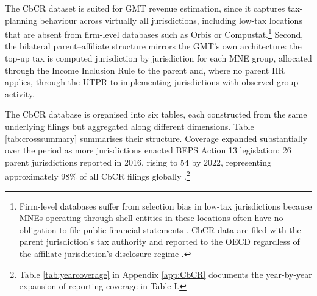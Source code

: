 \documentclass[11pt,a4paper]{article}
\begin{document}
The CbCR dataset is suited for GMT revenue estimation, since it captures tax-planning behaviour across virtually all jurisdictions, including low-tax locations that are absent from firm-level databases such as Orbis or Compustat.\footnote{Firm-level databases suffer from selection bias in low-tax jurisdictions because MNEs operating through shell entities in these locations often have no obligation to file public financial statements \citep{torslov2023}. CbCR data are filed with the parent jurisdiction's tax authority and reported to the OECD regardless of the affiliate jurisdiction's disclosure regime \citep{oecd2025a}.} Second, the bilateral parent--affiliate structure mirrors the GMT's own architecture: the top-up tax is computed jurisdiction by jurisdiction for each MNE group, allocated through the Income Inclusion Rule to the parent and, where no parent IIR applies, through the UTPR to implementing jurisdictions with observed group activity.

The CbCR database is organised into six tables, each constructed from the same underlying filings but aggregated along different dimensions. Table \ref{tab:crosssummary} summarises their structure. Coverage expanded substantially over the period as more jurisdictions enacted BEPS Action 13 legislation: 26 parent jurisdictions reported in 2016, rising to 54 by 2022, representing approximately 98\% of all CbCR filings globally \citep{oecd2025a}.\footnote{Table \ref{tab:yearcoverage} in Appendix \ref{app:CbCR} documents the year-by-year expansion of reporting coverage in Table I.}
\end{document}
